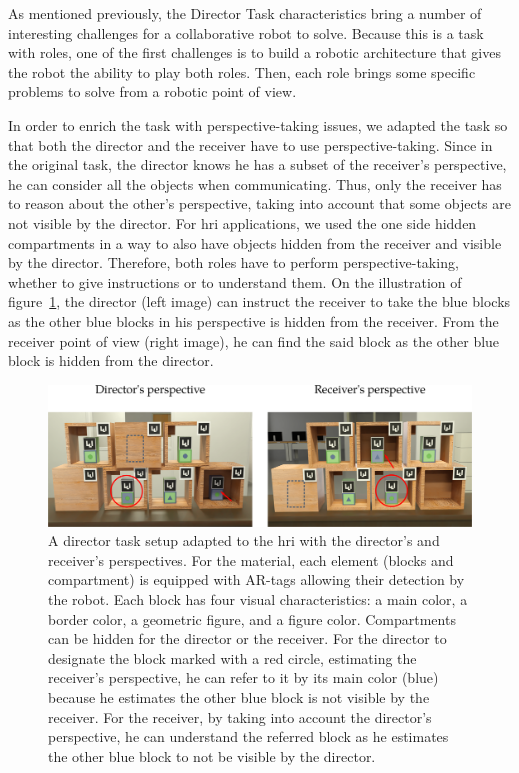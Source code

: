 As mentioned previously, the Director Task characteristics bring a number of interesting challenges for a collaborative robot to solve. Because this is a task with roles, one of the first challenges is to build a robotic architecture that gives the robot the ability to play both roles. Then, each role brings some specific problems to solve from a robotic point of view.

In order to enrich the task with perspective-taking issues, we adapted the task so that both the director and the receiver have to use perspective-taking. Since in the original task, the director knows he has a subset of the receiver's perspective, he can consider all the objects when communicating. Thus, only the receiver has to reason about the other's perspective, taking into account that some objects are not visible by the director. For \acrshort{hri} applications, we used the one side hidden compartments in a way to also have objects hidden from the receiver and visible by the director. Therefore, both roles have to perform perspective-taking, whether to give instructions or to understand them. On the illustration of figure~\ref{fig:chap9_setup}, the director (left image) can instruct the receiver to take the blue blocks as the other blue blocks in his perspective is hidden from the receiver. From the receiver point of view (right image), he can find the said block as the other blue block is hidden from the director.

\begin{figure}[ht!]
\centering
\includegraphics[width=\textwidth]{figures/chapter9/setup.png}
\caption{\label{fig:chap9_setup} A director task setup adapted to the \acrshort{hri} with the director's and receiver's perspectives. For the material, each element (blocks and compartment) is equipped with AR-tags allowing their detection by the robot. Each block has four visual characteristics: a main color, a border color, a geometric figure, and a figure color. Compartments can be hidden for the director or the receiver. For the director to designate the block marked with a red circle, estimating the receiver's perspective, he can refer to it by its main color (blue) because he estimates the other blue block is not visible by the receiver. For the receiver, by taking into account the director's perspective, he can understand the referred block as he estimates the other blue block to not be visible by the director.}
\end{figure}

